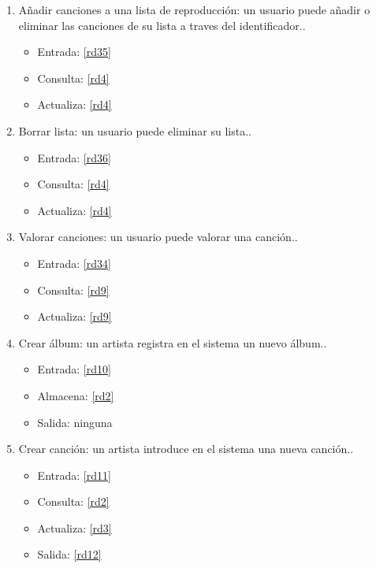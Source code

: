 \documentclass[12pt,a4paper]{article}
\begin{document}
\begin{enumerate}[label=\textnormal{RF\arabic*.}]
	 \item Añadir canciones a una lista de reproducción: un usuario puede añadir o eliminar las canciones de su lista a traves del identificador.\label{rf4}.
    	\begin{itemize}
			\item Entrada: \ref{rd35}
			\item Consulta: \ref{rd4}
			\item Actualiza: \ref{rd4}
		\end{itemize}

	 \item Borrar lista: un usuario puede eliminar su lista.\label{rf5}.
    	\begin{itemize}
			\item Entrada: \ref{rd36}
			\item Consulta: \ref{rd4}
			\item Actualiza: \ref{rd4}
		\end{itemize}
		
	 \item Valorar canciones: un usuario puede valorar una canción.\label{rf6}.
    	\begin{itemize}
			\item Entrada: \ref{rd34}
			\item Consulta: \ref{rd9}
			\item Actualiza: \ref{rd9}
		\end{itemize}
		
		
	 \item Crear álbum: un artista registra en el sistema un nuevo álbum.\label{rf7}.
    	\begin{itemize}
			\item Entrada: \ref{rd10}
			\item Almacena: \ref{rd2}
			\item Salida: ninguna
		\end{itemize}
		
	 \item Crear canción: un artista introduce en el sistema una nueva canción.\label{rf8}.
    	\begin{itemize}
			\item Entrada: \ref{rd11}
			\item Consulta: \ref{rd2}
			\item Actualiza: \ref{rd3}
			\item Salida: \ref{rd12} 
		\end{itemize}
		

\end{enumerate}
\end{document}

